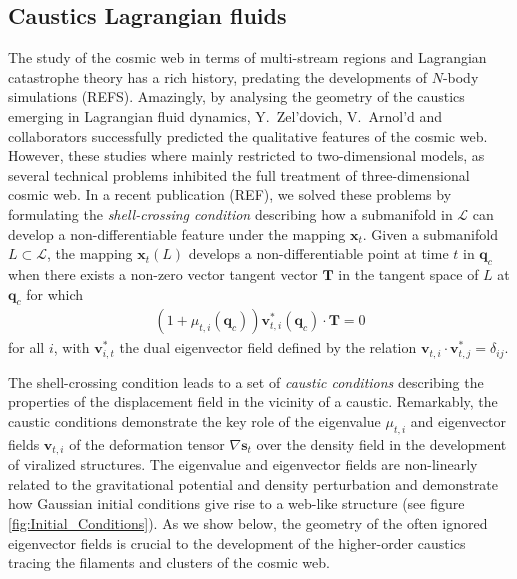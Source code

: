 \documentclass[a4paper, 11pt]{article}
\begin{document}
\subsection{Caustics Lagrangian fluids}
The study of the cosmic web in terms of multi-stream regions and Lagrangian catastrophe theory has a rich history, predating the developments of $N$-body simulations (REFS). Amazingly, by analysing the geometry of the caustics emerging in Lagrangian fluid dynamics, Y.\ Zel'dovich, V.\ Arnol'd and collaborators successfully predicted the qualitative features of the cosmic web. However, these studies where mainly restricted to two-dimensional models, as several technical problems inhibited the full treatment of three-dimensional cosmic web. In a recent publication (REF), we solved these problems by formulating the \textit{shell-crossing condition} describing how a submanifold in $\mathcal{L}$ can develop a non-differentiable feature under the mapping $\bm{x}_t$. Given a submanifold $L \subset \mathcal{L}$, the mapping $\bm{x}_t(L)$ develops a non-differentiable point at time $t$ in $\bm{q}_c$ when there exists a non-zero vector tangent vector $\bm{T}$ in the tangent space of $L$ at $\bm{q}_c$ for which 
\begin{align}
(1+\mu_{t,i}(\bm{q}_c))\bm{v}_{t,i}^*(\bm{q}_c) \cdot \bm{T}=0
\label{eq:shellCrossingCondition}
\end{align}
for all $i$, with $\bm{v}_{i,t}^*$ the dual eigenvector field defined by the relation $\bm{v}_{t,i}\cdot \bm{v}_{t,j}^* = \delta_{ij}$.

The shell-crossing condition leads to a set of \textit{caustic conditions} describing the properties of the displacement field in the vicinity of a caustic. Remarkably, the caustic conditions demonstrate the key role of the eigenvalue $\mu_{t,i}$ and eigenvector fields $\bm{v}_{t,i}$ of the deformation tensor $\nabla \bm{s}_t$ over the density field in the development of viralized structures. The eigenvalue and eigenvector fields are non-linearly related to the gravitational potential and density perturbation and demonstrate how Gaussian initial conditions give rise to a web-like structure (see figure \ref{fig:Initial_Conditions}). As we show below, the geometry of the often ignored eigenvector fields is crucial to the development of the higher-order caustics tracing the filaments and clusters of the cosmic web.
\end{document}
